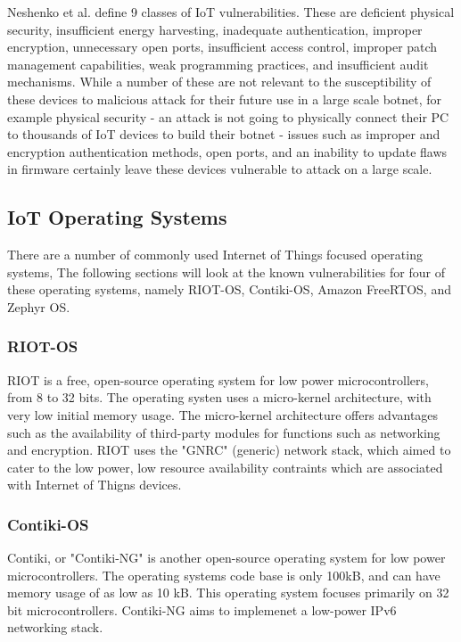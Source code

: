 Neshenko et al.\cite{neshenko_2019} define 9 classes of IoT vulnerabilities. These are
deficient physical security, insufficient energy harvesting, inadequate
authentication, improper encryption, unnecessary open ports, insufficient access
control, improper patch management capabilities, weak programming practices, and
insufficient audit mechanisms. While a number of these are not relevant to the
susceptibility of these devices to malicious attack for their future use in a
large scale botnet, for example physical security - an attack is not going to
physically connect their PC to thousands of IoT devices to build their botnet -
issues such as improper and encryption authentication methods, open ports, and
an inability to update flaws in firmware certainly leave these devices
vulnerable to attack on a large scale.

\subsection{IoT Operating Systems}

There are a number of commonly used Internet of Things focused operating
systems, The following sections will look at the known vulnerabilities for four
of these operating systems, namely RIOT-OS, Contiki-OS, Amazon FreeRTOS, and
Zephyr OS.

\subsubsection{RIOT-OS}

RIOT is a free, open-source operating system for low power microcontrollers,
from 8 to 32 bits. The operating systen uses a micro-kernel architecture, with
very low initial memory usage\cite{riotDocs}. The micro-kernel architecture offers advantages
such as the availability of third-party modules for functions such as networking
and encryption. RIOT uses the "GNRC" (generic) network stack, which aimed to
cater to the low power, low resource availability contraints which are
associated with Internet of Thigns devices\cite{lenders}.

\subsubsection{Contiki-OS}

Contiki, or "Contiki-NG" is another open-source operating system for low power
microcontrollers. The operating systems code base is only 100kB, and can have
memory usage of as low as 10 kB. This operating system focuses primarily on 32
bit microcontrollers. Contiki-NG aims to implemenet a low-power IPv6 networking
stack.

